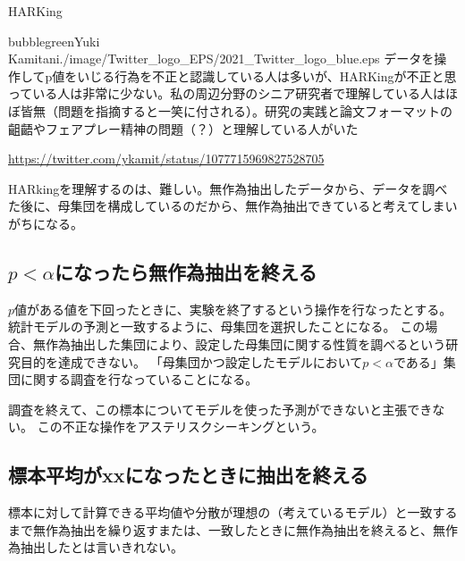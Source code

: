 \begin{SMbox}{HARKing}
    \begin{rightbubbles}{bubblegreen}{Yuki Kamitani}{./image/Twitter_logo_EPS/2021_Twitter_logo_blue.eps}
    データを操作してp値をいじる行為を不正と認識している人は多いが、HARKingが不正と思っている人は非常に少ない。私の周辺分野のシニア研究者で理解している人はほぼ皆無（問題を指摘すると一笑に付される）。研究の実践と論文フォーマットの齟齬やフェアプレー精神の問題（？）と理解している人がいた
        \begin{flushright} 
            \small	\url{https://twitter.com/ykamit/status/1077715969827528705}
        \end{flushright}    
    \end{rightbubbles}

    HARkingを理解するのは、難しい。無作為抽出したデータから、データを調べた後に、母集団を構成しているのだから、無作為抽出できていると考えてしまいがちになる。
\end{SMbox}
  

\subsection{$p<\alpha$になったら無作為抽出を終える}
$p$値がある値を下回ったときに、実験を終了するという操作を行なったとする。
統計モデルの予測と一致するように、母集団を選択したことになる。
この場合、無作為抽出した集団により、設定した母集団に関する性質を調べるという研究目的を達成できない。
「母集団かつ設定したモデルにおいて$p<\alpha$である」集団に関する調査を行なっていることになる。

調査を終えて、この標本についてモデルを使った予測ができないと主張できない。
この不正な操作をアステリスクシーキングという。


\subsection{標本平均がxxになったときに抽出を終える}
標本に対して計算できる平均値や分散が理想の（考えているモデル）と一致するまで無作為抽出を繰り返すまたは、一致したときに無作為抽出を終えると、無作為抽出したとは言いきれない。


